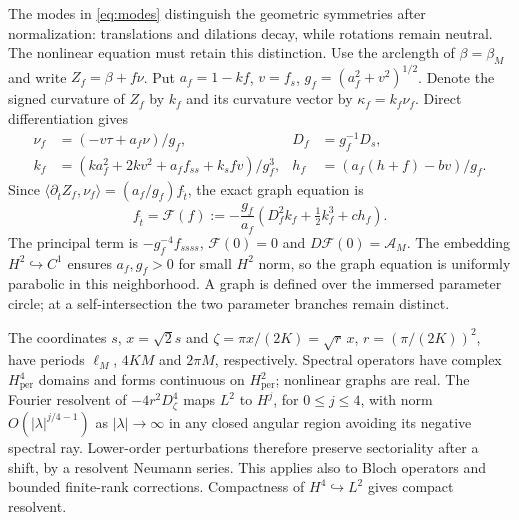 \documentclass[a4paper,11pt]{article}
\numberwithin{equation}{section}
\theoremstyle{definition}
\theoremstyle{remark}
\newcommand{\per}{\mathrm{per}}
\newcommand{\ip}[2]{\langle#1,#2\rangle}
\newcommand{\calF}{\mathcal F}
\begin{document}
The modes in \eqref{eq:modes} distinguish the geometric symmetries after normalization: translations and dilations decay, while rotations remain neutral. The nonlinear equation must retain this distinction. Use the arclength of $\beta=\beta_M$ and write $Z_f=\beta+f\nu$. Put $a_f=1-kf$, $v=f_s$, $g_f=(a_f^2+v^2)^{1/2}$. Denote the signed curvature of $Z_f$ by $k_f$ and its curvature vector by $\kappa_f=k_f\nu_f$. Direct differentiation gives
\begin{equation}\label{eq:graph-geometry}
 \begin{aligned}
 \nu_f&=(-v\tau+a_f\nu)/g_f,&D_f&=g_f^{-1}D_s,\\
 k_f&=(ka_f^2+2kv^2+a_ff_{ss}+k_sfv)/g_f^3,&
 h_f&=(a_f(h+f)-bv)/g_f.
 \end{aligned}
\end{equation}
Since $\ip{\partial_{\widehat t} Z_f}{\nu_f}=(a_f/g_f)f_{\widehat t}$, the exact graph equation is
\begin{equation}\label{eq:graph-flow}
 f_{\widehat t}=\calF(f):=-\frac{g_f}{a_f}
       (D_f^2k_f+\tfrac12k_f^3+ch_f).
\end{equation}
The principal term is $-g_f^{-4}f_{ssss}$, $\calF(0)=0$ and $D\calF(0)=\mathcal A_M$. The embedding $H^2\hookrightarrow C^1$ ensures $a_f,g_f>0$ for small $H^2$ norm, so the graph equation is uniformly parabolic in this neighborhood. A graph is defined over the immersed parameter circle; at a self-intersection the two parameter branches remain distinct.

The coordinates $s$, $x=\sqrt2s$ and $\zeta=\pi x/(2K)=\sqrt r\,x$, $r=(\pi/(2K))^2$, have periods $\ell_M$, $4KM$ and $2\pi M$, respectively. Spectral operators have complex $H^4_\per$ domains and forms continuous on $H^2_\per$; nonlinear graphs are real. The Fourier resolvent of $-4r^2D_\zeta^4$ maps $L^2$ to $H^j$, for $0\le j\le4$, with norm $O(|\lambda|^{j/4-1})$ as $|\lambda|\to\infty$ in any closed angular region avoiding its negative spectral ray. Lower-order perturbations therefore preserve sectoriality after a shift, by a resolvent Neumann series. This applies also to Bloch operators and bounded finite-rank corrections. Compactness of $H^4\hookrightarrow L^2$ gives compact resolvent.


\end{document}
